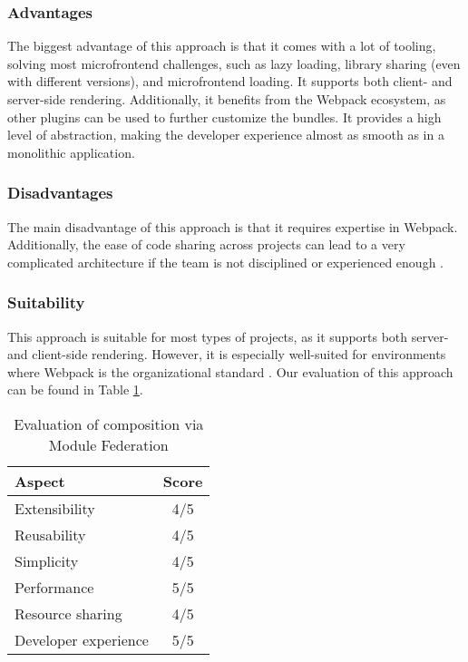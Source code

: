 \subsubsection{Advantages}
The biggest advantage of this approach is that it comes with a lot of tooling, solving most microfrontend challenges, such as lazy loading, library sharing (even with different versions), and microfrontend loading. It supports both client- and server-side rendering. Additionally, it benefits from the Webpack ecosystem, as other plugins can be used to further customize the bundles. It provides a high level of abstraction, making the developer experience almost as smooth as in a monolithic application.

\subsubsection{Disadvantages}
The main disadvantage of this approach is that it requires expertise in Webpack. Additionally, the ease of code sharing across projects can lead to a very complicated architecture if the team is not disciplined or experienced enough \cite{MezzaliraBuildingMf}.

\subsubsection{Suitability}
This approach is suitable for most types of projects, as it supports both server- and client-side rendering. However, it is especially well-suited for environments where Webpack is the organizational standard \cite{Taibi}. Our evaluation of this approach can be found in Table \ref{table:module-federation-evaluation}. 

\begin{table}[h]
  \centering
  \begin{tabular}{|p{4cm}|c|}
     \hline
        \textbf{Aspect} & \textbf{Score} \\
     \hline
        Extensibility & 4/5 \\
     \hline
        Reusability & 4/5 \\
     \hline
        Simplicity & 4/5 \\
     \hline
        Performance & 5/5 \\
     \hline
        Resource sharing & 4/5 \\
     \hline
        Developer experience & 5/5 \\
     \hline
  \end{tabular}
  \caption{Evaluation of composition via Module Federation}
  \label{table:module-federation-evaluation}
\end{table}


